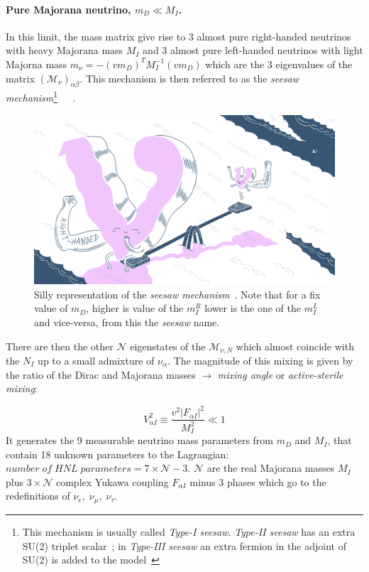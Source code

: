 \paragraph {Pure Majorana neutrino, $m_D \ll M_I$.}
In this limit, the mass matrix give rise to 3 almost pure right-handed neutrinos with heavy Majorana mass $M_I$ and 3 almost pure left-handed neutrinos with light Majorna mass $m_\nu = - (vm_D)^{T}M^{-1}_{I}(vm_D)$ which are the 3 eigenvalues of the matrix $(\mathcal{M}_{\nu})_{\alpha \beta}$. This mechanism is then referred to as the \emph{seesaw mechanism}\footnote{This mechanism is usually called \emph{Type-I seesaw}. \emph{Type-II seesaw} has an extra SU(2) triplet scalar~\cite{Deppisch_2015}; in \emph{Type-III seesaw} an extra fermion in the adjoint of SU(2) is added to the model~\cite{Foot:1988aq}}~\cite{MINKOWSKI1977421}~\cite{Mohapatra:1979ia}~\cite{Yanagida:1979as}.
\begin{figure}[h]
  \centering
  \includegraphics[width=.60\textwidth]{Figures/c3/funny.png}
    \caption{Silly representation of the \emph{seesaw mechanism}~\cite{funny}. Note that for a fix value of $m_D$, higher is value of the $m^{R}_I$ lower is the one of the $m^{L}_I$ and vice-versa, from this the \emph{seesaw} name.}
  \label{fig:c3funny}
\end{figure}
There are then the other $\mathcal{N}$ eigenstates of the $\mathcal{M}_{\nu,N}$ which almost coincide with the $N_I$ up to a small admixture of $\nu_\alpha$.
The magnitude of this mixing is given by the ratio of the Dirac and Majorana masses $\rightarrow$ \emph{mixing angle} or \emph{active-sterile mixing}:

\begin{equation}
\label{eq:v2}
 V^2_{\alpha I} \equiv \frac{v^{2}|F_{\alpha I}|^2}{M^{2}_{I}} \ll 1
\end{equation}
It generates the 9 measurable neutrino mass parameters from $m_D$ and $M_I$, that contain 18 unknown parameters to the Lagrangian: $number\; of \; HNL \; parameters = 7 \times \mathcal{N} - 3$. $\mathcal{N}$ are the real Majorana masses $M_I$ plus $3\times \mathcal{N}$ complex Yukawa coupling $F_{\alpha I}$ minus 3 phases which go to the redefinitions of $\nu_e, \; \nu_\mu,\; \nu_\tau$.

